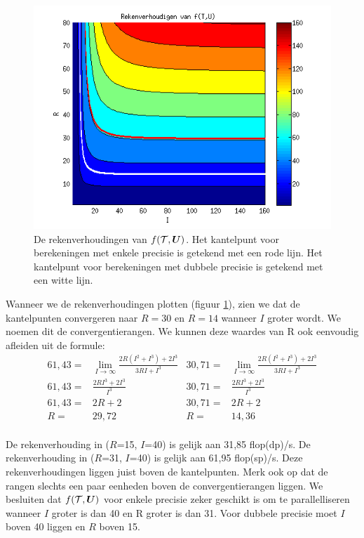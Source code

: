 \begin{figure}
\centering
\includegraphics{haalF}
\caption{\label{haalF}De rekenverhoudingen van $f(\mathcal{T}, \boldsymbol{U})$. Het kantelpunt voor berekeningen met enkele precisie is getekend met een rode lijn. Het kantelpunt voor berekeningen met dubbele precisie is getekend met een witte lijn.}
\end{figure}

Wanneer we de rekenverhoudingen plotten (figuur \ref{haalF}), zien we dat de kantelpunten convergeren naar $R = 30$ en $R = 14$ wanneer $I$ groter wordt. We noemen dit de convergentierangen. We kunnen deze waardes van R ook eenvoudig afleiden uit de formule:
\begin{align*}
    61,43 =& \lim_{I \to \infty} \frac{2R (I^2 + I^3) + 2I^3}{3RI + I^3} &
    30,71 =& \lim_{I \to \infty} \frac{2R (I^2 + I^3) + 2I^3}{3RI + I^3}\\
    61,43 =& \frac{2RI^3 + 2I^3}{I^3} &
    30,71 =& \frac{2RI^3 + 2I^3}{I^3}\\
    61,43 =& 2R + 2 &
    30,71 =& 2R + 2\\
    R =& 29,72 &
    R =& 14,36\\
\end{align*}

De rekenverhouding in ($R$=15, $I$=40) is gelijk aan 31,85 flop(dp)/s.
De rekenverhouding in ($R$=31, $I$=40) is gelijk aan 61,95 flop(sp)/s.
Deze rekenverhoudingen liggen juist boven de kantelpunten. Merk ook op dat de rangen slechts een paar eenheden boven de convergentierangen liggen. We besluiten dat $f(\mathcal{T}, \boldsymbol{U})$ voor enkele precisie zeker geschikt is om te parallelliseren wanneer $I$ groter is dan 40 en R groter is dan 31. Voor dubbele precisie moet $I$ boven 40 liggen en $R$ boven 15.

